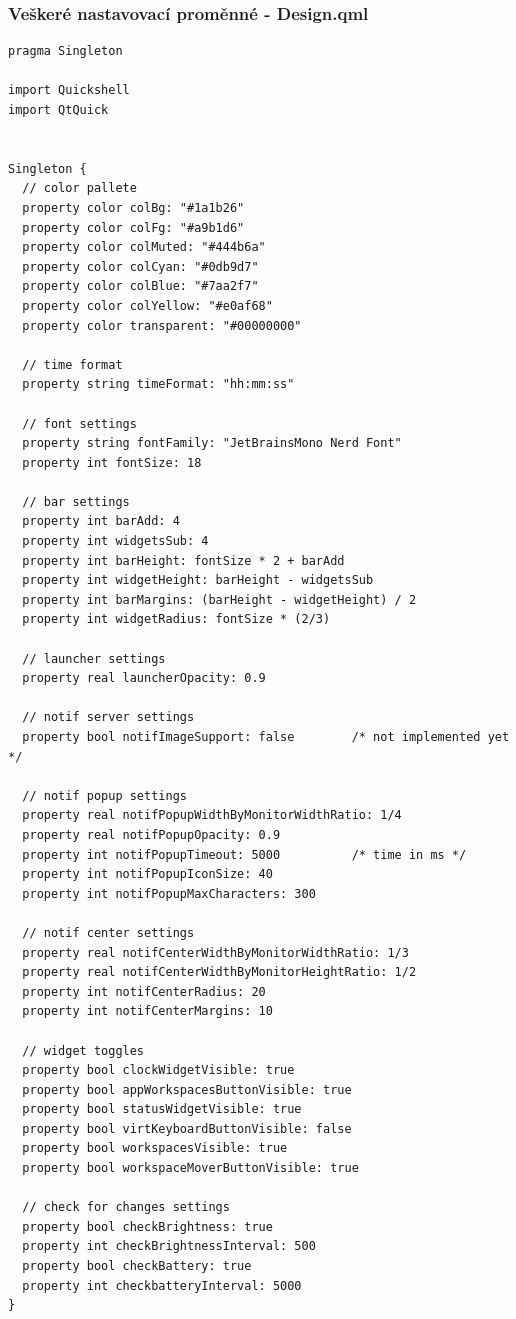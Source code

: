 \documentclass[12pt,a4paper]{article}
\begin{document}
\clearpage
\subsubsection{Veškeré nastavovací proměnné - Design.qml}
\label{Design.qml 0}
\begin{lstlisting}
pragma Singleton

import Quickshell
import QtQuick 


Singleton {
  // color pallete
  property color colBg: "#1a1b26"
  property color colFg: "#a9b1d6"
  property color colMuted: "#444b6a"
  property color colCyan: "#0db9d7"
  property color colBlue: "#7aa2f7"
  property color colYellow: "#e0af68"
  property color transparent: "#00000000"

  // time format
  property string timeFormat: "hh:mm:ss"

  // font settings
  property string fontFamily: "JetBrainsMono Nerd Font"
  property int fontSize: 18

  // bar settings
  property int barAdd: 4
  property int widgetsSub: 4
  property int barHeight: fontSize * 2 + barAdd
  property int widgetHeight: barHeight - widgetsSub
  property int barMargins: (barHeight - widgetHeight) / 2
  property int widgetRadius: fontSize * (2/3)

  // launcher settings
  property real launcherOpacity: 0.9

  // notif server settings
  property bool notifImageSupport: false        /* not implemented yet */

  // notif popup settings
  property real notifPopupWidthByMonitorWidthRatio: 1/4
  property real notifPopupOpacity: 0.9
  property int notifPopupTimeout: 5000          /* time in ms */
  property int notifPopupIconSize: 40
  property int notifPopupMaxCharacters: 300

  // notif center settings
  property real notifCenterWidthByMonitorWidthRatio: 1/3
  property real notifCenterWidthByMonitorHeightRatio: 1/2
  property int notifCenterRadius: 20
  property int notifCenterMargins: 10

  // widget toggles
  property bool clockWidgetVisible: true
  property bool appWorkspacesButtonVisible: true
  property bool statusWidgetVisible: true
  property bool virtKeyboardButtonVisible: false
  property bool workspacesVisible: true
  property bool workspaceMoverButtonVisible: true

  // check for changes settings
  property bool checkBrightness: true
  property int checkBrightnessInterval: 500
  property bool checkBattery: true
  property int checkbatteryInterval: 5000  
}
\end{lstlisting}
\end{document}
